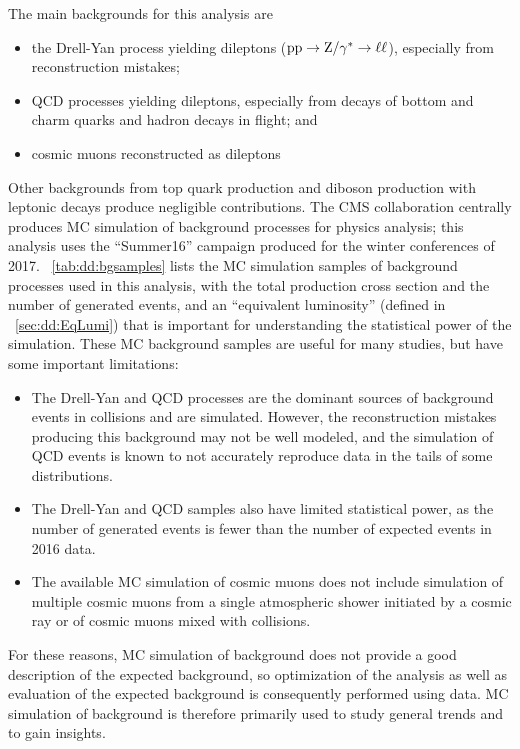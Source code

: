 The main backgrounds for this analysis are
\begin{itemize}
  \item the Drell-Yan process yielding dileptons ($\mathrm{p}\mathrm{p}\to\mathrm{Z}/\gamma^* \to \ell\ell$), especially from reconstruction mistakes;
  \item QCD processes yielding dileptons, especially from decays of bottom and charm quarks and hadron decays in flight; and
  \item cosmic muons reconstructed as dileptons
\end{itemize}
Other backgrounds from top quark production and diboson production with leptonic decays produce negligible contributions.
The CMS collaboration centrally produces MC simulation of background processes for physics analysis; this analysis uses the ``Summer16'' campaign produced for the winter conferences of 2017.
\Tab~\ref{tab:dd:bgsamples} lists the MC simulation samples of background processes used in this analysis, with the total production cross section and the number of generated events, and an ``equivalent luminosity'' (defined in \Sec~\ref{sec:dd:EqLumi}) that is important for understanding the statistical power of the simulation.
These MC background samples are useful for many studies, but have some important limitations:
\begin{itemize}
  \item The Drell-Yan and QCD processes are the dominant sources of background events in \pp collisions and are simulated. However, the reconstruction mistakes producing this background may not be well modeled, and the simulation of QCD events is known to not accurately reproduce data in the tails of some distributions.
  \item The Drell-Yan and QCD samples also have limited statistical power, as the number of generated events is fewer than the number of expected events in 2016 data.
  \item The available MC simulation of cosmic muons does not include simulation of multiple cosmic muons from a single atmospheric shower initiated by a cosmic ray or of cosmic muons mixed with \pp collisions.
\end{itemize}
For these reasons, MC simulation of background does not provide a good description of the expected background, so optimization of the analysis as well as evaluation of the expected background is consequently performed using data.
MC simulation of background is therefore primarily used to study general trends and to gain insights.

